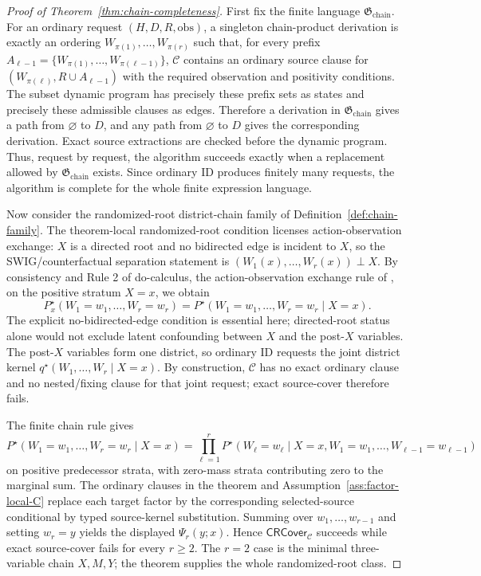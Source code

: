 \documentclass[11pt]{article}
\theoremstyle{definition}
\theoremstyle{plain}
\theoremstyle{remark}
\begin{document}
\begin{proof}[Proof of Theorem~\ref{thm:chain-completeness}]
First fix the finite language \(\mathfrak G_{\mathrm{chain}}\).  For an
ordinary request \((H,D,R,\mathrm{obs})\), a singleton chain-product
derivation is exactly an ordering \(W_{\pi(1)},\ldots,W_{\pi(r)}\) such that,
for every prefix \(A_{\ell-1}=\{W_{\pi(1)},\ldots,W_{\pi(\ell-1)}\}\),
\(\mathcal C\) contains an ordinary source clause for
\((W_{\pi(\ell)},R\cup A_{\ell-1})\) with the required observation and
positivity conditions.  The subset dynamic program has precisely these
prefix sets as states and precisely these admissible clauses as edges.
Therefore a derivation in \(\mathfrak G_{\mathrm{chain}}\) gives a path from
\(\varnothing\) to \(D\), and any path from \(\varnothing\) to \(D\) gives the
corresponding derivation.  Exact source extractions are checked before the
dynamic program.  Thus, request by request, the algorithm succeeds exactly
when a replacement allowed by \(\mathfrak G_{\mathrm{chain}}\) exists.  Since
ordinary ID produces finitely many requests, the algorithm is complete for
the whole finite expression language.

Now consider the randomized-root district-chain family of
Definition~\ref{def:chain-family}.  The theorem-local randomized-root
condition licenses action-observation exchange:
\(X\) is a directed root and no bidirected edge is incident to \(X\), so the
SWIG/counterfactual separation statement is
\((W_1(x),\ldots,W_r(x))\perp X\).  By consistency and Rule 2 of
do-calculus, the action-observation exchange rule of
\cite{Pearl1995CausalDiagrams}, on the positive stratum \(X=x\), we obtain
\[
  P^\star_x(W_1=w_1,\ldots,W_r=w_r)
  =
  P^\star(W_1=w_1,\ldots,W_r=w_r\mid X=x).
\]
The explicit no-bidirected-edge condition is essential here; directed-root
status alone would not exclude latent confounding between \(X\) and the
post-\(X\) variables.
The post-\(X\) variables form one district, so ordinary ID requests the joint
district kernel \(q^\star(W_1,\ldots,W_r\mid X=x)\).  By construction,
\(\mathcal C\) has no exact ordinary clause and no nested/fixing clause for
that joint request; exact source-cover therefore fails.

The finite chain rule gives
\[
  P^\star(W_1=w_1,\ldots,W_r=w_r\mid X=x)
  =
  \prod_{\ell=1}^{r}
  P^\star(W_\ell=w_\ell
    \mid X=x,W_1=w_1,\ldots,W_{\ell-1}=w_{\ell-1})
\]
on positive predecessor strata, with zero-mass strata contributing zero to
the marginal sum.  The ordinary clauses in the theorem and
Assumption~\ref{ass:factor-local-C} replace each target factor by the
corresponding selected-source conditional by typed source-kernel
substitution.  Summing over
\(w_1,\ldots,w_{r-1}\) and setting \(w_r=y\) yields the displayed
\(\Psi_r(y;x)\).  Hence \(\mathsf{CRCover}_{\mathcal C}\) succeeds while
exact source-cover fails for every \(r\ge 2\).  The \(r=2\) case is the
minimal three-variable chain \(X,M,Y\); the theorem supplies the whole
randomized-root class.
\end{proof}
\end{document}
